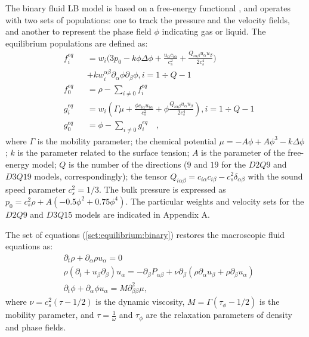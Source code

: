 \documentclass{CFD2011}
\begin{document}
The binary fluid LB model is
based on a free-energy functional \cite{swift,landau}, and operates with two
sets of populations: one to track the pressure and the velocity fields, and another to represent the
phase field $\phi$ indicating gas or liquid.
The equilibrium populations \cite{pooley-contact} are defined as:
\begin{equation}
\label{set:equilibrium:binary}
\begin{aligned}
&f_i^{eq}&&=w_i 
\biggl(3
p_0 - k \phi \Delta \phi
+\frac{u_{\alpha}c_{i\alpha}}{c_s^2}+\frac{Q_{i\alpha\beta}u_{\alpha } u_ {
\beta}}{2 c_s^4}\biggr)\\
&&&+k w_i^{\alpha\beta} \partial_{\alpha} \phi\partial_{\beta} \phi, i=1\div Q-1\\
&f_0^{eq}&&=\rho-\sum_{i\neq0}{f_i^{eq}}\\
&g_i^{eq}&&=w_i\left(\Gamma \mu + \frac{\phi c_{i\alpha} u_{i\alpha}}{c_s^2}+\phi
\frac{Q_{i\alpha\beta}u_{\alpha}u_{\beta}}{2 c_s^4}\right), i=1\div Q-1\\
&g_0^{eq}&&=\phi-\sum_{i\neq0}{g_i^{eq}}\quad,
\end{aligned}
\end{equation}
where $\Gamma$ is the mobility parameter; the chemical potential
$\mu=-A\phi+A\phi^3-k\Delta\phi$; $k$ is the parameter related to the surface
tension; $A$ is the parameter of the free-energy model; $Q$ is the number of the directions ($9$ and
$19$ for the $D2Q9$ and $D3Q19$ models, correspondingly); the tensor
$Q_{i\alpha\beta}=c_{i\alpha} c_{i\beta} - c_s^2 \delta_{\alpha\beta}$ with
the sound speed parameter $c_s^2=1/3$. The bulk pressure
is expressed as $p_0=c_s^2 \rho +A (-0.5 \phi^2+0.75 \phi^4)$. The particular weights and velocity
sets for the $D2Q9$ and $D3Q15$ models are indicated in Appendix A. 

The set of equations (\ref{set:equilibrium:binary}) restores the macroscopic
fluid equations as:
\begin{equation}
\begin{aligned}
&\partial_t \rho+ \partial_{\alpha} \rho u_{\alpha}=0\\
&\rho\left(\partial_t+u_{\beta}\partial_{\beta}\right) u_{\alpha}=
-\partial_{\beta}P_{\alpha \beta} +
\nu\partial_{\beta}\left(\rho\partial_{\alpha}u_{\beta}+\rho\partial_{\beta} u_{\alpha}\right)\\
&\partial_t \phi + \partial_{\alpha} \phi u_{\alpha}=M \partial^2_{\beta\beta} \mu,
\end{aligned}
\label{binary:fluid:system}
\end{equation}
where $\nu=c_s^2 (\tau-1/2)$ is the dynamic viscosity,
$M=\Gamma(\tau_{\phi}-1/2)$ is the mobility parameter, and $\tau=\frac{1}{\omega}$ and $\tau_{\phi}$
are the relaxation parameters of density and phase fields. 
\end{document}
